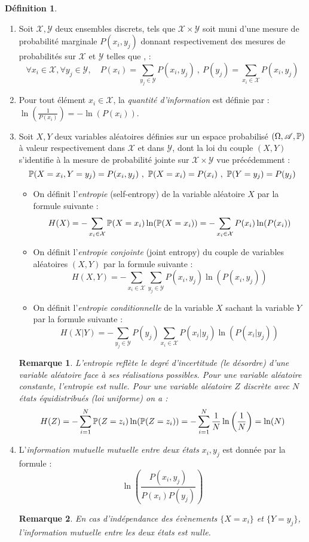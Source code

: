 \documentclass[12pt]{article}
\newtheorem{rmq}{Remarque}
\theoremstyle{definition}
\newtheorem{defi}{Définition}
\begin{document}
	\begin{defi}\hfil\\
		\begin{enumerate}
			\item Soit $\mathcal{X},\mathcal{Y}$ deux ensembles discrets, tels  que $\mathcal{X}\times \mathcal{Y}$ soit muni d'une mesure de probabilité marginale $P(x_i,y_j)$ donnant respectivement des mesures de probabilités sur $\mathcal{X}$ et $\mathcal{Y}$ telles que , : 
			$$ \forall x_i\in \mathcal{X},\forall y_j\in \mathcal{Y}, \quad P(x_i) = \sum_{y_j\in \mathcal{Y}}P(x_i,y_j) \ ,\ P(y_j) = \sum_{x_i\in \mathcal{X}}P(x_i,y_j)$$ 
			\item Pour tout élément $x_i\in \mathcal{X}$, la \textit{quantité d'information} est définie par : $\ln\left(\frac{1}{P(x_i)}\right) = -\ln\left(P(x_i)\right)$.
			\item Soit $X,Y$ deux variables aléatoires définies sur un espace probabilisé $(\Omega,\mathscr{A},\mathbb{P})$ à valeur respectivement dans $\mathcal{X}$ et dans $\mathcal{Y}$, dont la loi du couple $(X,Y)$ s'identifie à la mesure de probabilité jointe sur $\mathcal{X}\times \mathcal{Y}$ vue précédemment : 
			$$\mathbb{P}(X = x_i, Y= y_j) = P(x_i,y_j) \ ,\ \mathbb{P}(X = x_i) = P(x_i) \ ,\ \mathbb{P}(Y = y_j) = P(y_j)$$
			
			\begin{itemize}
				\item On définit l'\textit{entropie} (self-entropy) de la variable aléatoire $X$ par la formule suivante : 
				$$H(X) = - \sum_{x_i\in \mathcal{X}}\mathbb{P}(X=x_i)\ln(\mathbb{P}(X=x_i)) = - \sum_{x_i\in \mathcal{X}}P(x_i)\ln(P(x_i))$$
				\item On définit l'\textit{entropie conjointe} (joint entropy) du couple de variables aléatoires $(X,Y)$ par la formule suivante : 
				$$H(X,Y) = - \sum_{x_i\in \mathcal{X}}\sum_{y_j\in \mathcal{Y}}P(x_i,y_j)\ln(P(x_i,y_j))$$
				\item On définit l'\textit{entropie conditionnelle} de la variable $X$ sachant la variable $Y$ par la formule suivante : 
				$$H(X|Y) = -\sum_{y_j\in \mathcal{Y}} P(y_j)\sum_{x_i\in \mathcal{X}}P(x_i|y_j)\ln(P(x_i|y_j))$$
			\end{itemize}
		\begin{rmq}
			L'entropie reflète le degré d'incertitude (le désordre) d'une variable aléatoire face à ses réalisations possibles. Pour une variable aléatoire constante, l'entropie est nulle. Pour une variable aléatoire $Z$ discrète avec $N$ états équidistribués (loi uniforme) on a :
			$$H(Z) = - \sum_{i=1}^{N}\mathbb{P}(Z=z_i)\ln(\mathbb{P}(Z=z_i)) = - \sum_{i=1}^{N}\frac{1}{N}\ln\left(\frac{1}{N}\right) = \ln(N)$$
		\end{rmq}
			\item L'\textit{information mutuelle mutuelle entre deux états} $x_i,y_j$ est donnée par la formule : $$\ln\left(\dfrac{P(x_i,y_j)}{P(x_i)P(y_j)}\right)$$
			\begin{rmq}
				En cas d'indépendance des évènements $\{X=x_i\}$ et $\{Y=y_j\}$, l'information mutuelle entre les deux états est nulle.  
			\end{rmq}
		

\end{enumerate}
\end{defi}
\end{document}
